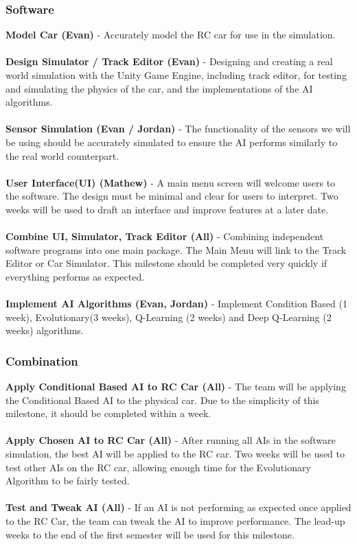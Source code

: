 \documentclass[8pt]{article}
\begin{document}
\subsubsection{Software}
\textbf{Model Car (Evan)} - Accurately model the RC car for use in the simulation.
\\\\
\textbf{Design Simulator / Track Editor (Evan)} - Designing and creating a real world simulation with the Unity\cite{Unity3D} Game Engine, including track editor, for testing and simulating the physics of the car, and the implementations of the AI algorithms.
\\\\
\textbf{Sensor Simulation (Evan / Jordan)} - The functionality of the sensors we will be using should be accurately simulated to ensure the AI performs similarly to the real world counterpart.
\\\\
\textbf{User Interface(UI) (Mathew)} - A main menu screen will welcome users to the software. The design must be minimal and clear for users to interpret. Two weeks will be used to draft an interface and improve features at a later date.
\\\\
\textbf{Combine UI, Simulator, Track Editor (All)} - Combining independent software programs into one main package. The Main Menu will link to the Track Editor or Car Simulator. This milestone should be completed very quickly if everything performs as expected.
\\\\
\textbf{Implement AI Algorithms (Evan, Jordan)} - Implement Condition Based (1 week), Evolutionary(3 weeks), Q-Learning (2 weeks)\cite{QLearningRobotControl} and Deep Q-Learning\cite{DeepQLearningReleasePaper} (2 weeks) algorithms.



\subsubsection{Combination}

\textbf{Apply Conditional Based AI to RC Car (All)} - The team will be applying the Conditional Based AI to the physical car. Due to the simplicity of this milestone, it should be completed within a week.
\\\\
\textbf{Apply Chosen AI to RC Car (All)} - After running all AIs in the software simulation, the best AI will be applied to the RC car. Two weeks will be used to test other AIs on the RC car, allowing enough time for the Evolutionary Algorithm to be fairly tested. 
\\\\
\textbf{Test and Tweak AI (All)} - If an AI is not performing as expected once applied to the RC Car, the team can tweak the AI to improve performance. The lead-up weeks to the end of the first semester will be used for this milestone.
\end{document}
